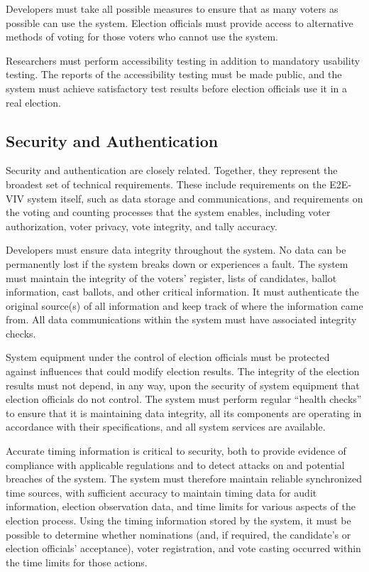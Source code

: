 Developers must take all possible measures to ensure that as many
voters as possible can use the system. Election officials must provide
access to alternative methods of voting for those voters who cannot
use the system.

Researchers must perform accessibility testing in addition to
mandatory usability testing. The reports of the accessibility testing
must be made public, and the system must achieve satisfactory test
results before election officials use it in a real election.

\subsection{Security and Authentication}

Security and authentication are closely related. Together, they
represent the broadest set of technical requirements. These include
requirements on the E2E-VIV system itself, such as data storage and
communications, and requirements on the voting and counting processes
that the system enables, including voter authorization, voter privacy,
vote integrity, and tally accuracy.

Developers must ensure data integrity throughout the system.  No data
can be permanently lost if the system breaks down or experiences a
fault. The system must maintain the integrity of the voters' register,
lists of candidates, ballot information, cast ballots, and other
critical information. It must authenticate the original source(s) of
all information and keep track of where the information came from. All
data communications within the system must have associated integrity
checks.

System equipment under the control of election officials must be
protected against influences that could modify election results. The
integrity of the election results must not depend, in any way, upon
the security of system equipment that election officials do not
control. The system must perform regular ``health checks'' to ensure
that it is maintaining data integrity, all its components are
operating in accordance with their specifications, and all system
services are available.

Accurate timing information is critical to security, both to provide
evidence of compliance with applicable regulations and to detect
attacks on and potential breaches of the system. The system must
therefore maintain reliable synchronized time sources, with sufficient
accuracy to maintain timing data for audit information, election
observation data, and time limits for various aspects of the election
process. Using the timing information stored by the system, it must be
possible to determine whether nominations (and, if required, the
candidate's or election officials' acceptance), voter registration,
and vote casting occurred within the time limits for those actions.

